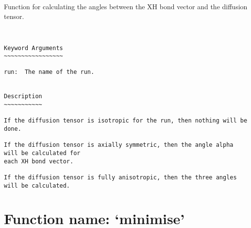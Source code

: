 Function for calculating the angles between the XH bond vector and the diffusion tensor.
\scriptsize
\begin{verbatim}


Keyword Arguments
~~~~~~~~~~~~~~~~~

run:  The name of the run.


Description
~~~~~~~~~~~

If the diffusion tensor is isotropic for the run, then nothing will be done.

If the diffusion tensor is axially symmetric, then the angle alpha will be calculated for
each XH bond vector.

If the diffusion tensor is fully anisotropic, then the three angles will be calculated.

\end{verbatim}

\normalsize
\section{Function name: `minimise'}

